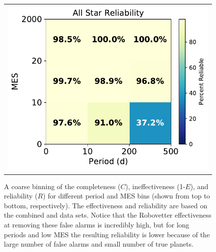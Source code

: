 \begin{figure}[hp]
\begin{center}
\begin{tabular}{c}
\includegraphics[width=.99\linewidth]{f8-bottom.pdf}
\end{tabular}
\caption{A coarse binning of the completeness ($C$), ineffectiveness (1-$E$), and reliability ($R$) for different period and MES bins (shown from top to bottom, respectively). The effectiveness and reliability are based on the combined \invtce{} and \scrtce{} data sets. Notice that the Robovetter effectiveness at removing these false alarms is incredibly high, but for long periods and low MES the resulting reliability is lower because of the large number of false alarms and small number of true planets.}
\label{f:scoregrid}
\end{center}
\end{figure}




